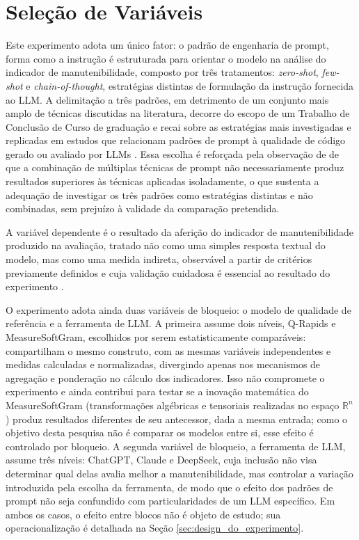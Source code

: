 \section{Seleção de Variáveis}
\label{sec:selecao_de_variaveis}

Este experimento adota um único fator: o padrão de engenharia de prompt, forma como a instrução é estruturada para orientar o modelo na análise do indicador de manutenibilidade, composto por três tratamentos: \textit{zero-shot}, \textit{few-shot} e \textit{chain-of-thought}, estratégias distintas de formulação da instrução fornecida ao LLM. A delimitação a três padrões, em detrimento de um conjunto mais amplo de técnicas discutidas na literatura, decorre do escopo de um Trabalho de Conclusão de Curso de graduação e recai sobre as estratégias mais investigadas e replicadas em estudos que relacionam padrões de prompt à qualidade de código gerado ou avaliado por LLMs \cite{DellaPortaEtAll, KhojahEtAll}. Essa escolha é reforçada pela observação de  de que a combinação de múltiplas técnicas de prompt não necessariamente produz resultados superiores às técnicas aplicadas isoladamente, o que sustenta a adequação de investigar os três padrões como estratégias distintas e não combinadas, sem prejuízo à validade da comparação pretendida.

A variável dependente é o resultado da aferição do indicador de manutenibilidade produzido na avaliação, tratado não como uma simples resposta textual do modelo, mas como uma medida indireta, observável a partir de critérios previamente definidos e cuja validação cuidadosa é essencial ao resultado do experimento .

O experimento adota ainda duas variáveis de bloqueio: o modelo de qualidade de referência e a ferramenta de LLM. A primeira assume dois níveis, Q-Rapids e MeasureSoftGram, escolhidos por serem estatisticamente comparáveis: compartilham o mesmo construto, com as mesmas variáveis independentes e medidas calculadas e normalizadas, divergindo apenas nos mecanismos de agregação e ponderação no cálculo dos indicadores. Isso não compromete o experimento e ainda contribui para testar se a inovação matemática do MeasureSoftGram (transformações algébricas e tensoriais realizadas no espaço $\mathbb{R}^n$) produz resultados diferentes de seu antecessor, dada a mesma entrada; como o objetivo desta pesquisa não é comparar os modelos entre si, esse efeito é controlado por bloqueio. A segunda variável de bloqueio, a ferramenta de LLM, assume três níveis: ChatGPT, Claude e DeepSeek, cuja inclusão não visa determinar qual delas avalia melhor a manutenibilidade, mas controlar a variação introduzida pela escolha da ferramenta, de modo que o efeito dos padrões de prompt não seja confundido com particularidades de um LLM específico. Em ambos os casos, o efeito entre blocos não é objeto de estudo; sua operacionalização é detalhada na Seção \ref{sec:design_do_experimento}.

